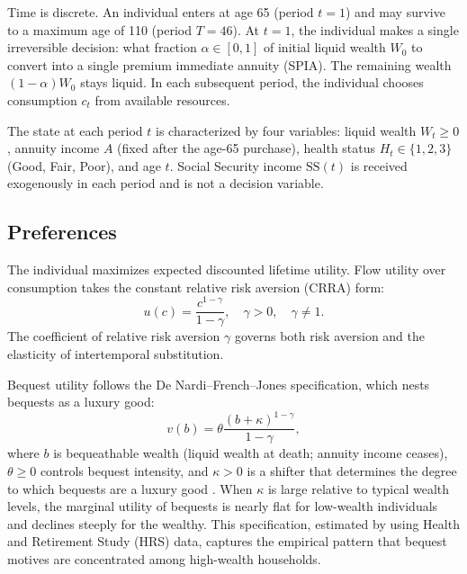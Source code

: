 \documentclass[12pt]{article}
\begin{document}
Time is discrete. An individual enters at age 65 (period $t = 1$) and may survive to a maximum age of 110 (period $T = 46$). At $t = 1$, the individual makes a single irreversible decision: what fraction $\alpha \in [0, 1]$ of initial liquid wealth $W_0$ to convert into a single premium immediate annuity (SPIA). The remaining wealth $(1 - \alpha)W_0$ stays liquid. In each subsequent period, the individual chooses consumption $c_t$ from available resources.

The state at each period $t$ is characterized by four variables: liquid wealth $W_t \geq 0$, annuity income $A$ (fixed after the age-65 purchase), health status $H_t \in \{1, 2, 3\}$ (Good, Fair, Poor), and age $t$. Social Security income $\text{SS}(t)$ is received exogenously in each period and is not a decision variable.

\subsection{Preferences}

The individual maximizes expected discounted lifetime utility. Flow utility over consumption takes the constant relative risk aversion (CRRA) form:
\begin{equation}
\label{eq:utility}
u(c) = \frac{c^{1-\gamma}}{1-\gamma}, \quad \gamma > 0, \quad \gamma \neq 1.
\end{equation}
The coefficient of relative risk aversion $\gamma$ governs both risk aversion and the elasticity of intertemporal substitution.

Bequest utility follows the De Nardi--French--Jones specification, which nests bequests as a luxury good:
\begin{equation}
\label{eq:bequest}
v(b) = \theta \frac{(b + \kappa)^{1-\gamma}}{1-\gamma},
\end{equation}
where $b$ is bequeathable wealth (liquid wealth at death; annuity income ceases), $\theta \geq 0$ controls bequest intensity, and $\kappa > 0$ is a shifter that determines the degree to which bequests are a luxury good \citep{denardi2004}. When $\kappa$ is large relative to typical wealth levels, the marginal utility of bequests is nearly flat for low-wealth individuals and declines steeply for the wealthy. This specification, estimated by \citet{lockwood2012} using Health and Retirement Study (HRS) data, captures the empirical pattern that bequest motives are concentrated among high-wealth households.
\end{document}
